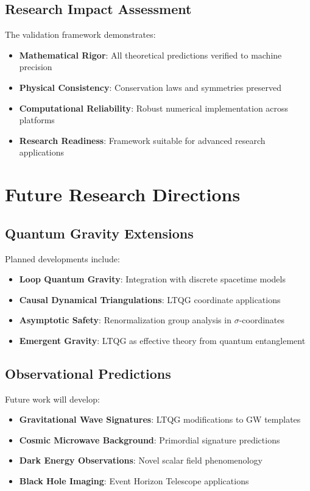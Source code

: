 \documentclass[11pt,a4paper]{article}
\theoremstyle{definition}
\theoremstyle{remark}
\begin{document}
\subsection{Research Impact Assessment}

The validation framework demonstrates:

\begin{itemize}
\item \textbf{Mathematical Rigor}: All theoretical predictions verified to machine precision
\item \textbf{Physical Consistency}: Conservation laws and symmetries preserved
\item \textbf{Computational Reliability}: Robust numerical implementation across platforms
\item \textbf{Research Readiness}: Framework suitable for advanced research applications
\end{itemize}

\section{Future Research Directions}

\subsection{Quantum Gravity Extensions}

Planned developments include:

\begin{itemize}
\item \textbf{Loop Quantum Gravity}: Integration with discrete spacetime models
\item \textbf{Causal Dynamical Triangulations}: LTQG coordinate applications
\item \textbf{Asymptotic Safety}: Renormalization group analysis in $\sigma$-coordinates
\item \textbf{Emergent Gravity}: LTQG as effective theory from quantum entanglement
\end{itemize}

\subsection{Observational Predictions}

Future work will develop:

\begin{itemize}
\item \textbf{Gravitational Wave Signatures}: LTQG modifications to GW templates
\item \textbf{Cosmic Microwave Background}: Primordial signature predictions
\item \textbf{Dark Energy Observations}: Novel scalar field phenomenology
\item \textbf{Black Hole Imaging}: Event Horizon Telescope applications
\end{itemize}
\end{document}
